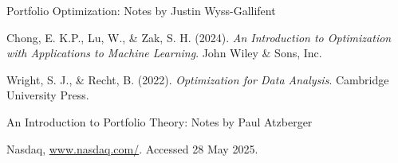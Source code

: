 \documentclass{article}
\theoremstyle{definition}
\begin{document}
\begin{thebibliography}{}

Portfolio Optimization: Notes by Justin Wyss-Gallifent

Chong, E. K.P., Lu, W., \& Zak, S. H. (2024). \emph{An Introduction to Optimization with Applications to Machine Learning}. John Wiley \& Sons, Inc. 

Wright, S. J., \& Recht, B. (2022). \emph{Optimization for Data Analysis}. Cambridge University Press. 

An Introduction to Portfolio Theory: Notes by Paul Atzberger

Nasdaq, \href{www.nasdaq.com/}{www.nasdaq.com/}. Accessed 28 May 2025. 

\end{thebibliography}
\end{document}
